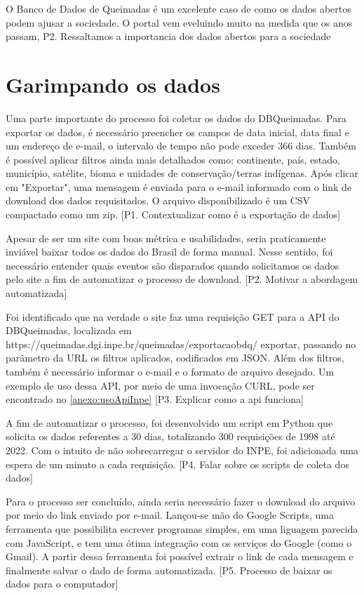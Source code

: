 \documentclass[cic,tc]{iiufrgs}
\begin{document}
O Banco de Dados de Queimadas é um excelente caso de como os dados abertos podem 
ajusar a sociedade. O portal vem eveluindo muito na medida que os anos passam, 
P2. Ressaltamos a importancia dos dados abertos para a sociedade \par


\section{Garimpando os dados}

Uma parte importante do processo foi coletar os dados do DBQueimadas. 
Para exportar os dados, é necessário preencher os campos de data inicial,
data final e um endereço de e-mail, o intervalo de tempo não 
pode exceder 366 dias. Também é possível aplicar filtros ainda mais 
detalhados como: continente, país, estado, município, satélite, bioma e 
unidades de conservação/terras indígenas. Após clicar em "Exportar", 
uma mensagem é enviada para o e-mail informado com o link de download 
dos dados requisitados. O arquivo disponibilizado é um CSV compactado 
como um zip. [P1. Contextualizar como é a exportação de dados]\par

Apesar de ser um site com boas métrica e usabilidades, seria praticamente 
inviável baixar todos os dados do Brasil de forma manual. Nesse sentido, 
foi necessário entender quais eventos são disparados quando solicitamos 
os dados pelo site a fim de automatizar o processo de download. 
[P2. Motivar a abordagem automatizada] \par

Foi identificado que na verdade o site faz uma requisição GET para a API do 
DBQueimadas, localizada em https://queimadas.dgi.inpe.br/queimadas/exportacaobdq/
exportar, passando no parâmetro da URL os filtros aplicados, codificados em JSON.
Além dos filtros, também é necessário informar o e-mail e o formato de arquivo
desejado. Um exemplo de uso dessa API, por meio de uma invocação CURL, pode 
ser encontrado no \ref{anexo:usoApiInpe} [P3. Explicar como a api funciona]

A fim de automatizar o processo, foi desenvolvido um script em Python que 
solicita os dados referentes a 30 dias, totalizando 300 requisições de 1998 
até 2022. Com 
o intuito de não sobrecarregar o servidor do INPE, foi adicionada uma espera de 
um minuto a cada requisição. [P4. Falar sobre os scripts de coleta dos dados] \par

Para o processo ser concluído, ainda seria 
necessário fazer o download do arquivo por meio do link enviado por e-mail.
Lançou-se mão do Google Scripts, uma ferramenta que possibilita escrever 
programas simples, em uma liguagem parecida com JavaScript, e tem uma ótima
integração com os serviços do Google (como o Gmail). A partir dessa ferramenta
foi possível extrair o link de cada mensagem e finalmente salvar o dado
de forma automatizada. [P5. Processo de baixar os dados para o computador] \par
\end{document}
